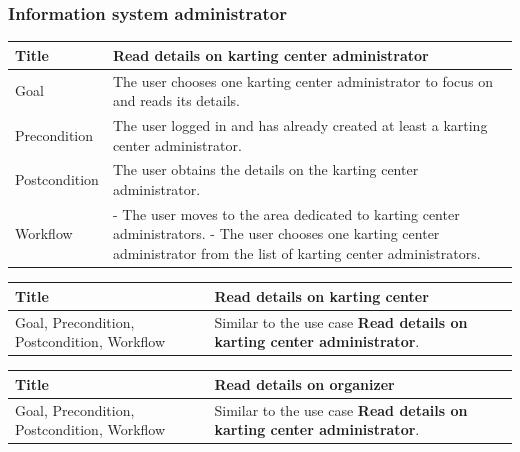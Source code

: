 \documentclass{beamer}
\begin{document}
\begin{frame}
    \frametitle{Information system administrator}
    \begin{table}
        \tiny
        \begin{tabular}{|p{2cm}|p{6cm}|}
        \hline  
        Title & \textbf{Read details on karting center administrator} \\
        \hline
        Goal & The user chooses one karting center administrator to focus on and reads its details. \\
        \hline
        Precondition & The user logged in and has already created at least a karting center 
        administrator. \\
        \hline
        Postcondition & The user obtains the details on the karting center administrator. \\
        \hline
        Workflow &
        - The user moves to the area dedicated to karting center administrators. \newline
        - The user chooses one karting center administrator from the 
        list of karting center administrators. \\
        \hline
        \end{tabular}
\end{table}

\begin{table}
    \tiny
    \begin{tabular}{|p{2cm}|p{6cm}|}
    \hline  
    Title & \textbf{Read details on karting center} \\
    \hline
    Goal, Precondition, Postcondition, Workflow & Similar 
    to the use case \textbf{Read details on karting center administrator}. \\
    \hline
    \end{tabular}
\end{table}

\begin{table}
    \tiny
    \begin{tabular}{|p{2cm}|p{6cm}|}
    \hline  
    Title & \textbf{Read details on organizer} \\
    \hline
    Goal, Precondition, Postcondition, Workflow & Similar 
    to the use case \textbf{Read details on karting center administrator}. \\
    \hline
    \end{tabular}
\end{table}

\end{frame}
\end{document}
